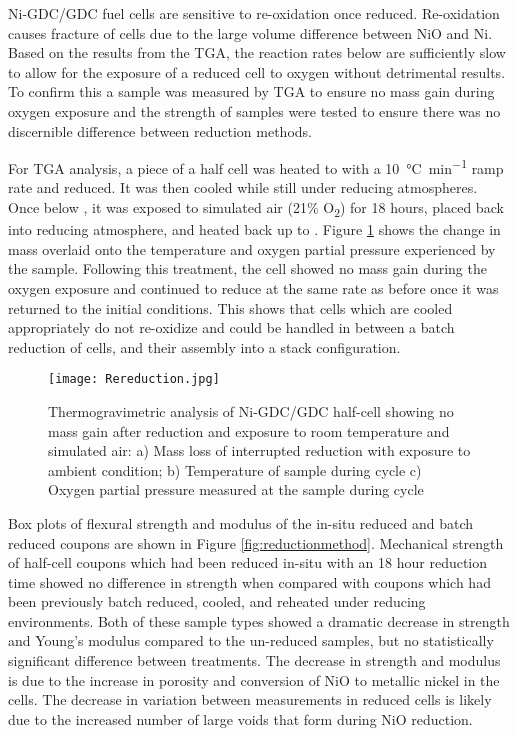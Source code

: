 Ni-GDC/GDC fuel cells are sensitive to re-oxidation once reduced.
Re-oxidation causes fracture of cells due to the large volume difference between NiO and Ni.\cite{Nakajo2012}
Based on the results from the TGA, the reaction rates below  are sufficiently slow to allow for the exposure of a reduced cell to oxygen without detrimental results.\cite{Richardson2003}
To confirm this a sample was measured by TGA to ensure no mass gain during oxygen exposure and the strength of samples were tested to ensure there was no discernible difference between reduction methods.

For TGA analysis, a piece of a half cell was heated to  with a \SI{10}{\celsius\per\minute} ramp rate and reduced.
It was then cooled while still under reducing atmospheres.
Once below , it was exposed to simulated air
(21\% O\textsubscript{2}) for 18 hours, placed back into reducing atmosphere, and heated back up to .
Figure \ref{fig:rereduction} shows the change in mass overlaid onto the temperature and oxygen partial pressure experienced by the sample.
Following this treatment, the cell showed no mass gain during the oxygen exposure and continued to reduce at the same rate as before once it was returned to the initial conditions.
This shows that cells which are cooled appropriately do not re-oxidize and could be handled in between a batch reduction of cells, and their assembly into a stack configuration.

\begin{figure}
    \texttt{[image: Rereduction.jpg]}
    \caption{Thermogravimetric analysis of Ni-GDC/GDC half-cell showing no mass gain after reduction and exposure to room temperature and simulated air: a) Mass loss of interrupted reduction with exposure to ambient condition; b) Temperature of sample during cycle c) Oxygen partial pressure measured at the sample during cycle}
    \label{fig:rereduction}
\end{figure}

Box plots of flexural strength and modulus of the in-situ reduced and batch reduced coupons are shown in Figure \ref{fig:reductionmethod}.
Mechanical strength of half-cell coupons which had been reduced in-situ with an 18 hour reduction time showed no difference in strength when compared with coupons which had been previously batch reduced, cooled, and reheated under reducing environments.
Both of these sample types showed a dramatic decrease in strength and Young's modulus compared to the un-reduced samples, but no statistically significant difference between treatments.
The decrease in strength and modulus is due to the increase in porosity and conversion of NiO to metallic nickel in the cells.
The decrease in variation between measurements in reduced cells is likely due to the increased number of large voids that form during NiO reduction.

